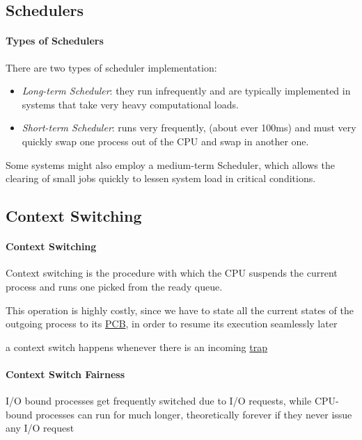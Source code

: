 \documentclass[openright, twoside]{report}
\theoremstyle{definition}
\theoremstyle{example}
\begin{document}
		\subsection{Schedulers}
			\paragraph{Types of Schedulers}
				There are two types of scheduler implementation:
				\begin{itemize}
					\item \emph{Long-term Scheduler}: they run infrequently and are typically 
					implemented in systems that take very heavy computational loads.
					\item \emph{Short-term Scheduler}: runs very frequently, (about ever 100ms) 
					and must very quickly swap one process out of the CPU and swap in another one.
				\end{itemize}

				Some systems might also employ a medium-term Scheduler, which allows the 
				clearing of small jobs quickly to lessen system load in critical conditions.

		\subsection{Context Switching}
		\label{ssec:context}
			\paragraph{Context Switching}
				Context switching is the procedure with which the CPU suspends the current process and 
				runs one picked from the ready queue.

				This operation is highly costly, since we have to state all the current states of the
				outgoing process to its \hyperref[par:PCB]{PCB}, in order to resume its execution seamlessly later

				a context switch happens whenever there is an incoming \hyperref[par:trap]{trap}

			\paragraph{Context Switch Fairness}
			\label{par:times}
				I/O bound processes get frequently switched due to I/O requests, while CPU-bound processes
				can run for much longer, theoretically forever if they never issue any I/O request
\end{document}
